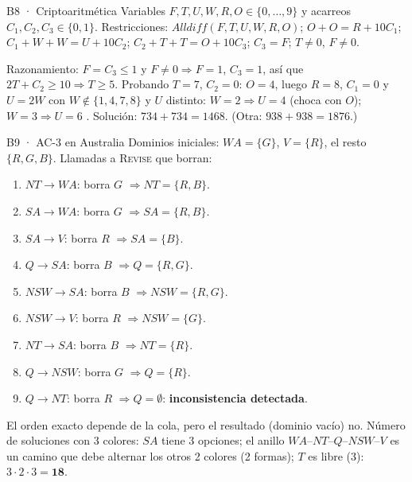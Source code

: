 \begin{solucion}{B8 · Criptoaritmética}
Variables $F,T,U,W,R,O\in\{0,\dots,9\}$ y acarreos $C_1,C_2,C_3\in\{0,1\}$. Restricciones:
$\textit{Alldiff}(F,T,U,W,R,O)$; $O+O=R+10C_1$; $C_1+W+W=U+10C_2$; $C_2+T+T=O+10C_3$; $C_3=F$;
$T\ne0$, $F\ne0$.

Razonamiento: $F=C_3\le1$ y $F\ne0\Rightarrow F=1$, $C_3=1$, así que $2T+C_2\ge10\Rightarrow T\ge5$.
Probando $T=7$, $C_2=0$: $O=4$, luego $R=8$, $C_1=0$ y $U=2W$ con $W\notin\{1,4,7,8\}$ y $U$ distinto:
$W=2\Rightarrow U=4$ (choca con $O$); $W=3\Rightarrow U=6$ \checkmark{}. Solución: $734+734=1468$.
(Otra: $938+938=1876$.)
\end{solucion}

\begin{solucion}{B9 · AC-3 en Australia}
Dominios iniciales: $WA=\{G\}$, $V=\{R\}$, el resto $\{R,G,B\}$. Llamadas a \textsc{Revise} que borran:
\begin{enumerate}[nosep]
\item $NT\to WA$: borra $G$ $\Rightarrow NT=\{R,B\}$.
\item $SA\to WA$: borra $G$ $\Rightarrow SA=\{R,B\}$.
\item $SA\to V$: borra $R$ $\Rightarrow SA=\{B\}$.
\item $Q\to SA$: borra $B$ $\Rightarrow Q=\{R,G\}$.
\item $NSW\to SA$: borra $B$ $\Rightarrow NSW=\{R,G\}$.
\item $NSW\to V$: borra $R$ $\Rightarrow NSW=\{G\}$.
\item $NT\to SA$: borra $B$ $\Rightarrow NT=\{R\}$.
\item $Q\to NSW$: borra $G$ $\Rightarrow Q=\{R\}$.
\item $Q\to NT$: borra $R$ $\Rightarrow Q=\emptyset$: \textbf{inconsistencia detectada}.
\end{enumerate}
El orden exacto depende de la cola, pero el resultado (dominio vacío) no. Número de soluciones con 3
colores: $SA$ tiene 3 opciones; el anillo $WA$–$NT$–$Q$–$NSW$–$V$ es un camino que debe alternar los otros
2 colores (2 formas); $T$ es libre (3): $3\cdot2\cdot3=\mathbf{18}$.
\end{solucion}


